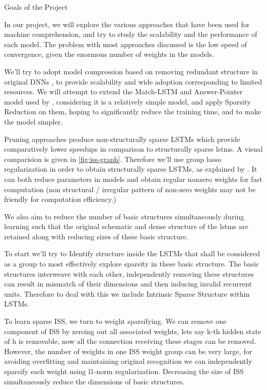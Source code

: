 \documentclass{article}
\begin{document}
\begin{psection}{Goals of the Project}

	In our project, we will explore the various approaches that have been used for machine comprehension, and try to study the scalability and the performance of each model. The problem with most approaches discussed is the low speed of convergence, given the enormous number of weights in the models.

	We’ll try to adopt model compression based on removing redundant structure in original DNNs \citep{iss}, to provide scalability and wide adoption corresponding to limited resources. We will attempt to extend the Match-LSTM and Answer-Pointer model used by , considering it is a relatively simple model, and apply Sparsity Reduction on them, hoping to significantly reduce the training time, and to make the model simpler.

	Pruning approaches produce non-structurally sparse LSTMs which provide comparatively lower speedups in comparison to structurally sparse lstms. A visual comparision is given in \ref{fig:iss-graph}. Therefore we’ll use group lasso regularization in order to obtain structurally sparse LSTMs, as explained by \cite{iss}. It can both reduce parameters in models and obtain regular nonzero weights for fast computation
	(non structural / irregular pattern of non-zero weights may not be friendly for computation efficiency.)

	We also aim to reduce the number of basic structures simultaneously during learning such that the original schematic and dense structure of the lstms are retained along with reducing sizes of these basic structure.

	To start we’ll try to Identify structure inside the LSTMs that shall be considered as a group to most effectively explore sparsity in these basic structure. The basic structures interweave with each other, independently removing these structures can result in mismatch of their dimensions and then inducing invalid recurrent units. Therefore to deal with this we include Intrinsic Sparse Structure within LSTMs.

	To learn sparse ISS, we turn to weight sparsifying. We can remove one component of ISS by zeroing out all associated weights, lets say k-th hidden state of h is removable, now all the connection receiving these stages can be removed. However, the number of weights in one ISS weight group can be very large, for avoiding overfitting and maintaining original recognition we can independently sparsify each weight using l1-norm regularization. Decreasing the size of ISS simultaneously reduce the dimensions of basic structures.


\end{psection}
\end{document}
